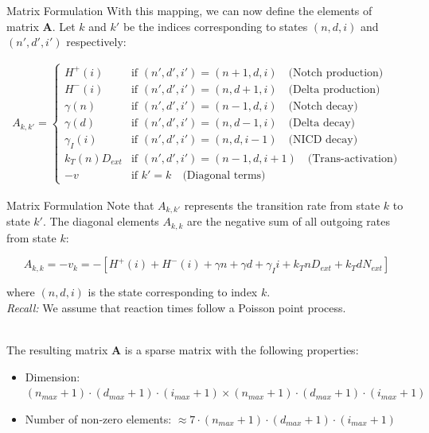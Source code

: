 \documentclass[aspectratio=169]{beamer}
\begin{document}
\begin{frame}{Matrix Formulation}
With this mapping, we can now define the elements of matrix $\mathbf{A}$. Let $k$ and $k'$ be the indices corresponding to states $(n,d,i)$ and $(n',d',i')$ respectively:

\begin{align*}
A_{k,k'} = 
\begin{cases}
H^+(i) & \text{if } (n',d',i') = (n+1,d,i) \quad \text{(Notch production)} \\
H^-(i) & \text{if } (n',d',i') = (n,d+1,i) \quad \text{(Delta production)} \\
\gamma(n) & \text{if } (n',d',i') = (n-1,d,i) \quad \text{(Notch decay)} \\
\gamma(d) & \text{if } (n',d',i') = (n,d-1,i) \quad \text{(Delta decay)} \\
\gamma_I(i) & \text{if } (n',d',i') = (n,d,i-1) \quad \text{(NICD decay)} \\
k_T(n)D_{ext} & \text{if } (n',d',i') = (n-1,d,i+1) \quad \text{(Trans-activation)} \\
-v & \text{if } k' = k \quad \text{(Diagonal terms)}
\end{cases}
\end{align*}
\end{frame}

\begin{frame}{Matrix Formulation}
Note that $A_{k,k'}$ represents the transition rate from state $k$ to state $k'$. The diagonal elements $A_{k,k}$ are the negative sum of all outgoing rates from state $k$:

\[
A_{k,k} = -v_k =-[H^+(i) + H^-(i) + \gamma n + \gamma d + \gamma_I i + k_T n D_{ext} + k_T d N_{ext}]
\]

where $(n,d,i)$ is the state corresponding to index $k$.\\
\textit{Recall:} We assume that reaction times follow a Poisson point process.\\~\\

\pause

The resulting matrix $\mathbf{A}$ is a sparse matrix with the following properties:
\begin{itemize}
    \item Dimension: $(n_{max}+1) \cdot (d_{max}+1) \cdot (i_{max}+1) \times (n_{max}+1) \cdot (d_{max}+1) \cdot (i_{max}+1)$
    \item Number of non-zero elements: $\approx 7 \cdot (n_{max}+1) \cdot (d_{max}+1) \cdot (i_{max}+1)$
\end{itemize}
\end{frame}
\end{document}
